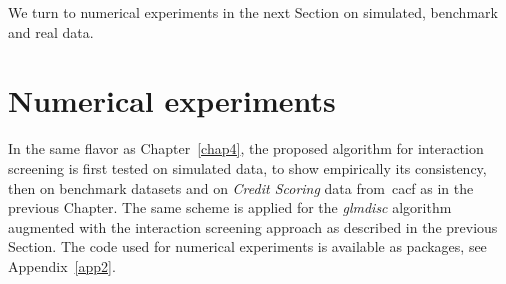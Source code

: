 We turn to numerical experiments in the next Section on simulated, benchmark and real data.

%
%
%
%
%
%
%
%
%
%
%
%
%




\section{Numerical experiments}

In the same flavor as Chapter~\ref{chap4}, the proposed algorithm for interaction screening is first tested on simulated data, to show empirically its consistency, then on benchmark datasets and on \textit{Credit Scoring} data from~\gls{cacf} as in the previous Chapter. The same scheme is applied for the \textit{glmdisc} algorithm augmented with the interaction screening approach as described in the previous Section.
The code used for numerical experiments is available as packages, see Appendix~\ref{app2}.


